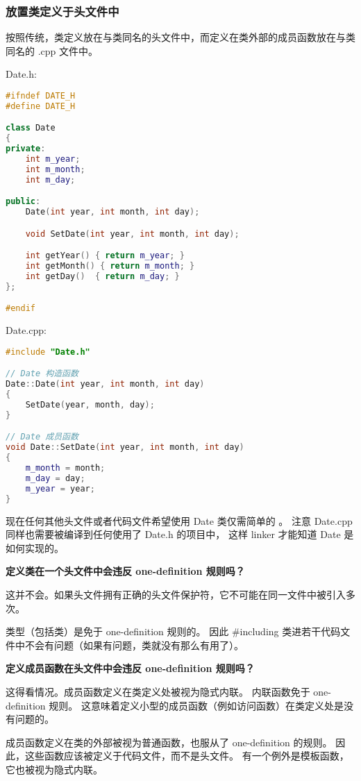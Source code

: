 \documentclass[../../LearnCpp.tex]{subfiles}
\begin{document}
\subsubsection*{放置类定义于头文件中}

按照传统，类定义放在与类同名的头文件中，而定义在类外部的成员函数放在与类同名的 .cpp 文件中。

Date.h:

\begin{lstlisting}[language=C++]
#ifndef DATE_H
#define DATE_H

class Date
{
private:
    int m_year;
    int m_month;
    int m_day;

public:
    Date(int year, int month, int day);

    void SetDate(int year, int month, int day);

    int getYear() { return m_year; }
    int getMonth() { return m_month; }
    int getDay()  { return m_day; }
};

#endif
\end{lstlisting}

Date.cpp:

\begin{lstlisting}[language=C++]
#include "Date.h"

// Date 构造函数
Date::Date(int year, int month, int day)
{
    SetDate(year, month, day);
}

// Date 成员函数
void Date::SetDate(int year, int month, int day)
{
    m_month = month;
    m_day = day;
    m_year = year;
}
\end{lstlisting}

现在任何其他头文件或者代码文件希望使用 Date 类仅需简单的 。
注意 Date.cpp 同样也需要被编译到任何使用了 Date.h 的项目中，
这样 linker 才能知道 Date 是如何实现的。

\textbf{定义类在一个头文件中会违反 one-definition 规则吗？}

这并不会。如果头文件拥有正确的头文件保护符，它不可能在同一文件中被引入多次。

类型（包括类）是免于 one-definition 规则的。
因此 \#including 类进若干代码文件中不会有问题（如果有问题，类就没有那么有用了）。

\textbf{定义成员函数在头文件中会违反 one-definition 规则吗？}

这得看情况。成员函数定义在类定义处被视为隐式内联。
内联函数免于 one-definition 规则。
这意味着定义小型的成员函数（例如访问函数）在类定义处是没有问题的。

成员函数定义在类的外部被视为普通函数，也服从了 one-definition 的规则。
因此，这些函数应该被定义于代码文件，而不是头文件。
有一个例外是模板函数，它也被视为隐式内联。
\end{document}
